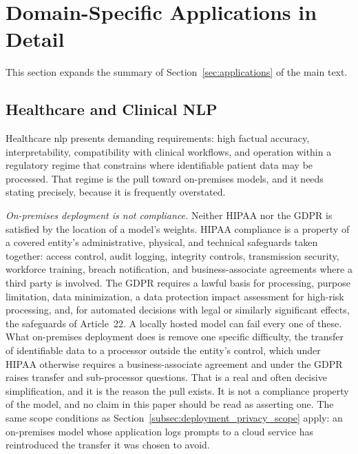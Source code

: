 
\section{Domain-Specific Applications in Detail}
\label{supp:applications}

This section expands the summary of Section~\ref{sec:applications} of the main text.

\subsection{Healthcare and Clinical NLP}
\label{subsec:applications_healthcare}

Healthcare \gls{nlp} presents demanding requirements: high factual accuracy, interpretability, compatibility with clinical workflows, and operation within a regulatory regime that constrains where identifiable patient data may be processed. That regime is the pull toward on-premises models, and it needs stating precisely, because it is frequently overstated.

\emph{On-premises deployment is not compliance.} Neither HIPAA nor the GDPR is
satisfied by the location of a model's weights. HIPAA compliance is a property of
a covered entity's administrative, physical, and technical safeguards taken
together: access control, audit logging, integrity controls, transmission
security, workforce training, breach notification, and business-associate
agreements where a third party is involved. The GDPR requires a lawful basis for
processing, purpose limitation, data minimization, a data protection impact
assessment for high-risk processing, and, for automated decisions with legal or
similarly significant effects, the safeguards of Article~22. A locally hosted
model can fail every one of these. What on-premises deployment does is remove one
specific difficulty, the transfer of identifiable data to a processor outside the
entity's control, which under HIPAA otherwise requires a business-associate
agreement and under the GDPR raises transfer and sub-processor questions. That is
a real and often decisive simplification, and it is the reason the pull exists.
It is not a compliance property of the model, and no claim in this paper should
be read as asserting one. The same scope conditions as
Section~\ref{subsec:deployment_privacy_scope} apply: an on-premises model whose
application logs prompts to a cloud service has reintroduced the transfer it was
chosen to avoid.

